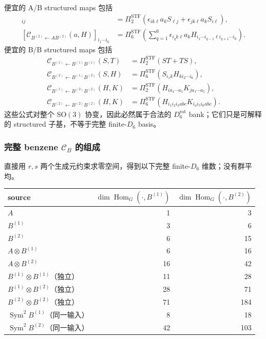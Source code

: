 \documentclass[11pt,a4paper,fontset=fandol]{ctexart}
\newcommand{\SO}{\mathrm{SO}}
\newcommand{\Sym}{\operatorname{Sym}}
\newcommand{\Hom}{\operatorname{Hom}}
\newcommand{\cB}{\mathcal C_B}
\newcommand{\PiSTF}[1]{\Pi_{#1}^{\mathrm{STF}}}
\begin{document}
便宜的 A/B structured maps 包括
\begin{align}
  [\mathcal C_{B^{(1)}\leftarrow AB^{(1)}}(a,S)]_{ij}
  &=\PiSTF{2}\!\left(
  \epsilon_{ik\ell}a_kS_{\ell j}
  +\epsilon_{jk\ell}a_kS_{i\ell}
  \right),\\
  [\mathcal C_{B^{(2)}\leftarrow AB^{(2)}}(a,H)]_{i_1\cdots i_6}
  &=\PiSTF{6}\!\left(
  \sum_{q=1}^{6}\epsilon_{i_qk\ell}a_k
  H_{i_1\cdots i_{q-1}\ell i_{q+1}\cdots i_6}
  \right).
  \label{eq:benz-ab-fast}
\end{align}
便宜的 B/B structured maps 包括
\begin{align}
  \mathcal C_{B^{(1)}\leftarrow B^{(1)}B^{(1)}}(S,T)
  &=\PiSTF{2}(ST+TS),\\
  \mathcal C_{B^{(2)}\leftarrow B^{(1)}B^{(2)}}(S,H)
  &=\PiSTF{6}\!\left(S_{i_1k}H_{ki_2\cdots i_6}\right),\\
  \mathcal C_{B^{(1)}\leftarrow B^{(2)}B^{(2)}}(H,K)
  &=\PiSTF{2}\!\left(H_{ia_1\cdots a_5}K_{ja_1\cdots a_5}\right),\\
  \mathcal C_{B^{(2)}\leftarrow B^{(2)}B^{(2)}}(H,K)
  &=\PiSTF{6}\!\left(H_{i_1i_2i_3abc}K_{i_4i_5i_6abc}\right).
  \label{eq:benz-bb-fast}
\end{align}
这些公式对整个 $\SO(3)$ 协变，因此必然属于合法的 $D_6^{\mathrm{rot}}$ bank；它们只是可解释的 structured 子基，不等于完整 finite-$D_6$ basis。

\subsubsection{完整 benzene $\cB$ 的组成}

直接用 $r,s$ 两个生成元约束求零空间，得到以下完整 finite-$D_6$ 维数；没有群平均。

\begin{center}
\small
\begin{tabular}{lrr}
\toprule
source & $\dim\Hom_G(\cdot,B^{(1)})$ & $\dim\Hom_G(\cdot,B^{(2)})$\\
\midrule
$A$ & 1 & 3\\
$B^{(1)}$ & 3 & 6\\
$B^{(2)}$ & 6 & 15\\
$A\otimes B^{(1)}$ & 6 & 16\\
$A\otimes B^{(2)}$ & 16 & 42\\
$B^{(1)}\otimes B^{(1)}$（独立） & 11 & 28\\
$B^{(1)}\otimes B^{(2)}$（独立） & 28 & 71\\
$B^{(2)}\otimes B^{(2)}$（独立） & 71 & 184\\
$\Sym^2B^{(1)}$（同一输入） & 8 & 18\\
$\Sym^2B^{(2)}$（同一输入） & 42 & 103\\
\bottomrule
\end{tabular}
\end{center}
\end{document}
